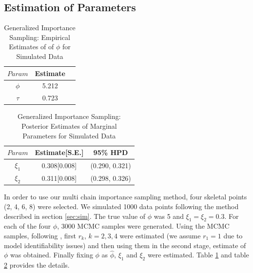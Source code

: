 \documentclass[11pt]{article}
\theoremstyle{remboldstyle}
\begin{document}
\subsection{Estimation of Parameters}
\begin{table}[H]
\caption{Generalized Importance Sampling: Empirical Estimates of of $\phi$ for Simulated Data}
\centering
\begin{tabular}{c c c }
\hline
$Param$      & Estimate\\
\hline
$\phi$ &  5.212\\
$\tau$ &  0.723 \\
  \hline           
\end{tabular}
\label{tab21}
\end{table}
\begin{table}[H]
\caption{Generalized Importance Sampling: Posterior Estimates of Marginal Parameters for Simulated Data}
\centering
\begin{tabular}{c c c }
\hline
$Param$      & Estimate[S.E.] & 95\% HPD\\
\hline
$\xi_1$      & 0.308[0.008]        & (0.290, 0.321)\\   
$\xi_2$      & 0.311[0.008]        & (0.298, 0.326)\\
  \hline           
\end{tabular}
\label{tab2}
\end{table}
\noindent
In order to use our multi chain importance sampling method, four skeletal points (2, 4, 6, 8) were selected. We simulated 1000 data points following the method described in section \ref{sec:sim}. The true value of $\phi$ was 5 and $\xi_1 = \xi_2 = 0.3$. For each of the four $\phi$, 3000 MCMC samples were generated. Using the MCMC samples, following \cite{geyer:1994}, first $r_k$, $k = 2, 3, 4$ were estimated (we assume $r_1 = 1$ due to model identifiability issues) and then using them in the second stage, estimate of $\phi$ was obtained. Finally fixing $\phi$ as $\hat{\phi}$, $\xi_1$ and $\xi_2$ were estimated. Table \ref{tab21} and table \ref{tab2} provides the details.
\end{document}
